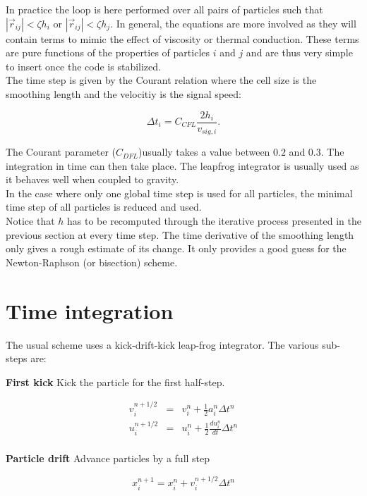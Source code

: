 \documentclass[a4paper,10pt]{article}
\begin{document}
In practice the loop is here performed over all pairs of particles such that $|\vec{r}_{ij}| < \zeta h_i$ or
$|\vec{r}_{ij}| < \zeta
h_j$. In general, the equations are more involved as they will contain terms to mimic the effect of viscosity or
thermal conduction. These terms are pure functions of the properties of particles $i$ and $j$ and are thus very simple
to insert once the code is stabilized.\\

The time step is given by the Courant relation where the cell size is the smoothing length and the velocitiy is the
signal speed:

\begin{equation}
 \Delta t_i = C_{CFL} \frac{2h_i}{v_{sig,i}}.
\label{eq:dt}
\end{equation}

The Courant parameter ($C_{DFL}$)usually takes a value between $0.2$ and $0.3$. The integration in time can then
take place. The
leapfrog integrator is usually used as it behaves well when coupled to gravity. \\
In the case where only one global time step is used for all particles, the minimal time step of all particles is reduced
and used. \\

Notice that $h$ has to be recomputed through the iterative process
presented in the previous section at every time step. The time
derivative of the smoothing length only gives a rough estimate of its
change. It only provides a good guess for the Newton-Raphson (or
bisection) scheme.

\section{Time integration}

The usual scheme uses a kick-drift-kick leap-frog integrator. The various sub-steps are:

\textbf{First kick} Kick the particle for the first half-step.

\begin{eqnarray*}
 v_i^{n+1/2} &=& v_i^{n} + \frac{1}{2} a_i^{n}\Delta t^n \\
 u_i^{n+1/2} &=& u_i^{n} + \frac{1}{2} \frac{du_i^n}{dt}\Delta t^n \\
\end{eqnarray*}

\textbf{Particle drift} Advance particles by a full step

\begin{equation*}
 x_i^{n+1} = x_i^n + v_i^{n+{1/2}} \Delta t^n
\end{equation*}
\end{document}
